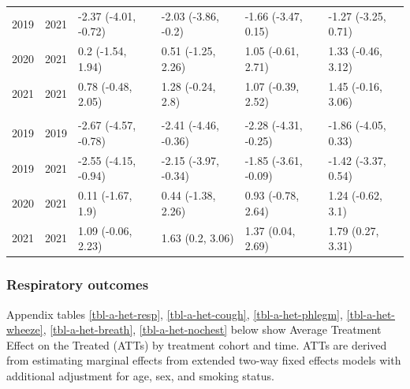 \documentclass[
  letterpaper,
  DIV=11,
  numbers=noendperiod]{scrartcl}
\makeatletter
\renewenvironment{table}%
  {\renewcommand\familydefault\sfdefault
   \@float{table}}
  {\end@float}
\makeatother
\begin{document}
\begin{table}
\begin{tabular}{rrllll}
\hspace{1em}2019 & 2021 & -2.37 (-4.01, -0.72) & -2.03 (-3.86, -0.2) & -1.66 (-3.47, 0.15) & -1.27 (-3.25, 0.71)\\
\hspace{1em}2020 & 2021 & 0.2 (-1.54, 1.94) & 0.51 (-1.25, 2.26) & 1.05 (-0.61, 2.71) & 1.33 (-0.46, 3.12)\\
\hspace{1em}2021 & 2021 & 0.78 (-0.48, 2.05) & 1.28 (-0.24, 2.8) & 1.07 (-0.39, 2.52) & 1.45 (-0.16, 3.06)\\
\addlinespace[0.3em]
\multicolumn{6}{l}{\textbf{Central DBP}}\\
\hspace{1em}2019 & 2019 & -2.67 (-4.57, -0.78) & -2.41 (-4.46, -0.36) & -2.28 (-4.31, -0.25) & -1.86 (-4.05, 0.33)\\
\hspace{1em}2019 & 2021 & -2.55 (-4.15, -0.94) & -2.15 (-3.97, -0.34) & -1.85 (-3.61, -0.09) & -1.42 (-3.37, 0.54)\\
\hspace{1em}2020 & 2021 & 0.11 (-1.67, 1.9) & 0.44 (-1.38, 2.26) & 0.93 (-0.78, 2.64) & 1.24 (-0.62, 3.1)\\
\hspace{1em}2021 & 2021 & 1.09 (-0.06, 2.23) & 1.63 (0.2, 3.06) & 1.37 (0.04, 2.69) & 1.79 (0.27, 3.31)\\
\bottomrule
\end{tabular}
\end{table}

\newpage

\hypertarget{respiratory-outcomes}{%
\subsubsection{Respiratory outcomes}\label{respiratory-outcomes}}

Appendix tables \ref{tbl-a-het-resp}, \ref{tbl-a-het-cough},
\ref{tbl-a-het-phlegm}, \ref{tbl-a-het-wheeze}, \ref{tbl-a-het-breath},
\ref{tbl-a-het-nochest} below show Average Treatment Effect on the
Treated (ATTs) by treatment cohort and time. ATTs are derived from
estimating marginal effects from extended two-way fixed effects models
with additional adjustment for age, sex, and smoking status.
\end{document}
